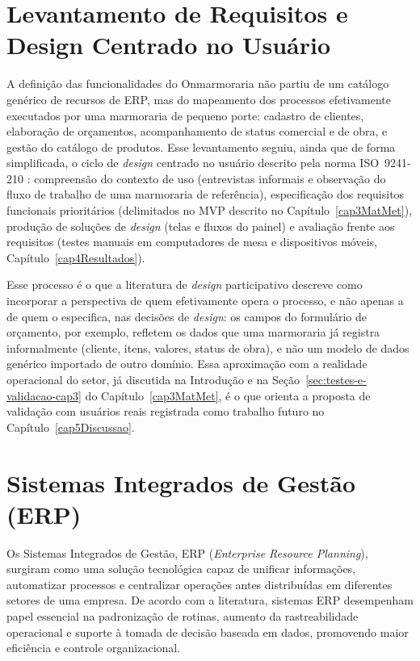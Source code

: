 \section{Levantamento de Requisitos e Design Centrado no Usuário}
\label{sec:levantamento-requisitos}

A definição das funcionalidades do Onmarmoraria não partiu de um catálogo genérico de recursos de ERP, mas do mapeamento dos processos efetivamente executados por uma marmoraria de pequeno porte: cadastro de clientes, elaboração de orçamentos, acompanhamento de status comercial e de obra, e gestão do catálogo de produtos. Esse levantamento seguiu, ainda que de forma simplificada, o ciclo de \textit{design} centrado no usuário descrito pela norma ISO~9241-210 \cite{iso9241210}: compreensão do contexto de uso (entrevistas informais e observação do fluxo de trabalho de uma marmoraria de referência), especificação dos requisitos funcionais prioritários (delimitados no MVP descrito no Capítulo~\ref{cap3MatMet}), produção de soluções de \textit{design} (telas e fluxos do painel) e avaliação frente aos requisitos (testes manuais em computadores de mesa e dispositivos móveis, Capítulo~\ref{cap4Resultados}).

Esse processo é o que a literatura de \textit{design} participativo descreve como incorporar a perspectiva de quem efetivamente opera o processo, e não apenas a de quem o especifica, nas decisões de \textit{design}: os campos do formulário de orçamento, por exemplo, refletem os dados que uma marmoraria já registra informalmente (cliente, itens, valores, status de obra), e não um modelo de dados genérico importado de outro domínio. Essa aproximação com a realidade operacional do setor, já discutida na Introdução e na Seção~\ref{sec:testes-e-validacao-cap3} do Capítulo~\ref{cap3MatMet}, é o que orienta a proposta de validação com usuários reais registrada como trabalho futuro no Capítulo~\ref{cap5Discussao}.

\section{Sistemas Integrados de Gestão (ERP)}
Os Sistemas Integrados de Gestão, ERP (\textit{Enterprise Resource Planning}), surgiram como uma solução tecnológica capaz de unificar informações, automatizar processos e centralizar operações antes distribuídas em diferentes setores de uma empresa. De acordo com a literatura, sistemas ERP desempenham papel essencial na padronização de rotinas, aumento da rastreabilidade operacional e suporte à tomada de decisão baseada em dados, promovendo maior eficiência e controle organizacional.

